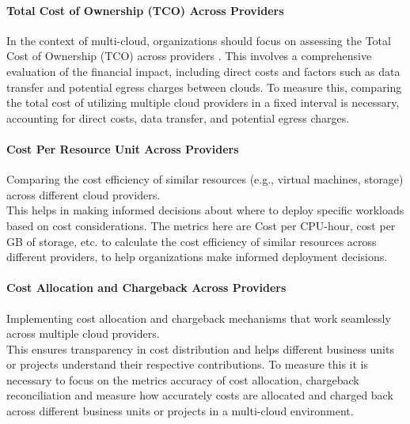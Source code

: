 \paragraph{Total Cost of Ownership (TCO) Across Providers}
In the context of multi-cloud, organizations should focus on 
assessing the Total Cost of Ownership (TCO) across providers\cite{walterbuschEvaluatingCloudComputing2013} \cite{martensCostingCloudComputing2012}. 
This involves a comprehensive evaluation of the financial impact, 
including direct costs and factors such as data transfer and potential egress 
charges between clouds.
To measure this, comparing the total cost of utilizing multiple cloud providers in a fixed interval is necessary, 
accounting for direct costs, data transfer, and potential egress charges.

\paragraph{Cost Per Resource Unit Across Providers}

Comparing the cost efficiency of similar resources (e.g., virtual machines, storage)
across different cloud providers. \\
This helps in making informed decisions about where to deploy specific workloads 
based on cost considerations.
The metrics here are Cost per CPU-hour, cost per GB of storage, etc. to calculate the 
cost efficiency of similar resources across different providers, to
help organizations make informed deployment decisions.




\paragraph{Cost Allocation and Chargeback Across Providers}

Implementing cost allocation and chargeback mechanisms that work seamlessly across 
multiple cloud providers. \\
This ensures transparency in cost distribution and helps different business units 
or projects understand their respective contributions.
To measure this it is necessary to focus on the metrics accuracy of cost allocation, 
chargeback reconciliation and
measure how accurately costs are allocated and charged back across different 
business units or projects in a multi-cloud environment.

